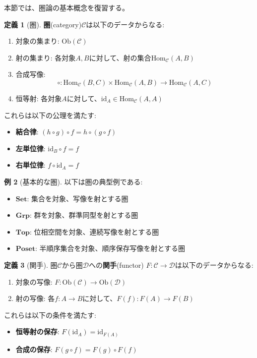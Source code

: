 \documentclass[a4paper,12pt]{article}
\theoremstyle{definition}
\newtheorem{definition}{定義}[section]
\newtheorem{example}[definition]{例}
\begin{document}
本節では、圏論の基本概念を復習する。

\begin{definition}[圏]\label{def:category}
\textbf{圏}(category)$\mathcal{C}$は以下のデータからなる:
\begin{enumerate}
\item 対象の集まり: $\text{Ob}(\mathcal{C})$
\item 射の集まり: 各対象$A, B$に対して、射の集合$\text{Hom}_{\mathcal{C}}(A, B)$
\item 合成写像: 
\[
\circ : \text{Hom}_{\mathcal{C}}(B, C) \times \text{Hom}_{\mathcal{C}}(A, B) \to \text{Hom}_{\mathcal{C}}(A, C)
\]
\item 恒等射: 各対象$A$に対して、$\text{id}_A \in \text{Hom}_{\mathcal{C}}(A, A)$
\end{enumerate}
これらは以下の公理を満たす:
\begin{itemize}
\item \textbf{結合律}: $(h \circ g) \circ f = h \circ (g \circ f)$
\item \textbf{左単位律}: $\text{id}_B \circ f = f$
\item \textbf{右単位律}: $f \circ \text{id}_A = f$
\end{itemize}
\end{definition}

\begin{example}[基本的な圏]
以下は圏の典型例である:
\begin{itemize}
\item $\mathbf{Set}$: 集合を対象、写像を射とする圏
\item $\mathbf{Grp}$: 群を対象、群準同型を射とする圏
\item $\mathbf{Top}$: 位相空間を対象、連続写像を射とする圏
\item $\mathbf{Poset}$: 半順序集合を対象、順序保存写像を射とする圏
\end{itemize}
\end{example}

\begin{definition}[関手]\label{def:functor}
圏$\mathcal{C}$から圏$\mathcal{D}$への\textbf{関手}(functor) $F : \mathcal{C} \to \mathcal{D}$は以下のデータからなる:
\begin{enumerate}
\item 対象の写像: $F : \text{Ob}(\mathcal{C}) \to \text{Ob}(\mathcal{D})$
\item 射の写像: 各$f : A \to B$に対して、$F(f) : F(A) \to F(B)$
\end{enumerate}
これらは以下の条件を満たす:
\begin{itemize}
\item \textbf{恒等射の保存}: $F(\text{id}_A) = \text{id}_{F(A)}$
\item \textbf{合成の保存}: $F(g \circ f) = F(g) \circ F(f)$
\end{itemize}
\end{definition}
\end{document}
